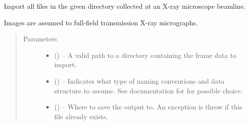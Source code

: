 \documentclass[letterpaper,10pt,english]{sphinxmanual}
\begin{document}

\begin{fulllineitems}
\label{\detokenize{xanespy:xanespy.importers.import_frameset}}
Import all files in the given directory collected at an X-ray
microscope beamline.

Images are assumed to full-field transmission X-ray micrographs.
\begin{quote}\begin{description}
\item[{Parameters}] \leavevmode\begin{itemize}
\item {} 
 () -- A valid path to a directory containing the frame data to import.

\item {} 
 () -- Indicates what type of naming conventions and data structure to
assume. See documentation for  for
possible choice.

\item {} 
 () -- Where to save the output to. An exception is throw if this file
already exists.

\end{itemize}

\end{description}\end{quote}

\end{fulllineitems}

\end{document}
